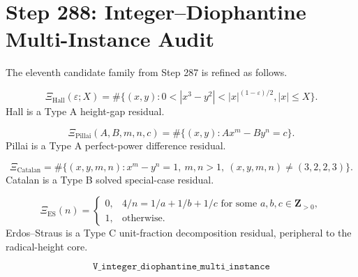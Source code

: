 \section*{Step 288: Integer--Diophantine Multi-Instance Audit}

The eleventh candidate family from Step 287 is refined as follows.

\[
\Xi_{\mathrm{Hall}}(\varepsilon;X)=
\#\{(x,y):0<|x^3-y^2|<|x|^{(1-\varepsilon)/2}, |x|\le X\}.
\]
Hall is a Type A height-gap residual.

\[
\Xi_{\mathrm{Pillai}}(A,B,m,n,c)=
\#\{(x,y):Ax^m-By^n=c\}.
\]
Pillai is a Type A perfect-power difference residual.

\[
\Xi_{\mathrm{Catalan}}=
\#\{(x,y,m,n):x^m-y^n=1,\ m,n>1,\ (x,y,m,n)\ne(3,2,2,3)\}.
\]
Catalan is a Type B solved special-case residual.

\[
\Xi_{\mathrm{ES}}(n)=
\begin{cases}
0,&4/n=1/a+1/b+1/c\text{ for some }a,b,c\in\mathbf Z_{>0},\\
1,&\text{otherwise}.
\end{cases}
\]
Erdos--Straus is a Type C unit-fraction decomposition residual, peripheral to the radical-height core.

\[
\boxed{\texttt{V\_integer\_diophantine\_multi\_instance}}
\]
